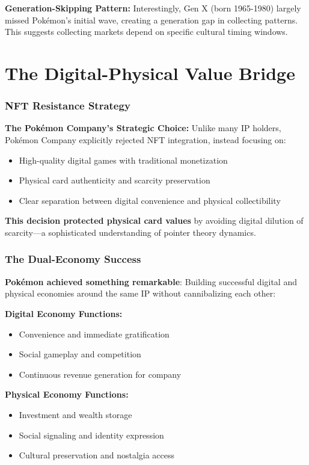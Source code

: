 \documentclass[11pt,oneside]{book}
\begin{document}
\textbf{Generation-Skipping Pattern:}
Interestingly, Gen X (born 1965-1980) largely missed Pokémon's initial wave, creating a generation gap in collecting patterns. This suggests collecting markets depend on specific cultural timing windows.

\section{The Digital-Physical Value Bridge}

\subsubsection{NFT Resistance Strategy}

\textbf{The Pokémon Company's Strategic Choice:}
Unlike many IP holders, Pokémon Company explicitly rejected NFT integration, instead focusing on:
\begin{itemize}
\item High-quality digital games with traditional monetization
\item Physical card authenticity and scarcity preservation
\item Clear separation between digital convenience and physical collectibility
\end{itemize}

\textbf{This decision protected physical card values} by avoiding digital dilution of scarcity—a sophisticated understanding of pointer theory dynamics.

\subsubsection{The Dual-Economy Success}

\textbf{Pokémon achieved something remarkable}: Building successful digital and physical economies around the same IP without cannibalizing each other:

\textbf{Digital Economy Functions:}
\begin{itemize}
\item Convenience and immediate gratification
\item Social gameplay and competition
\item Continuous revenue generation for company
\end{itemize}

\textbf{Physical Economy Functions:}
\begin{itemize}
\item Investment and wealth storage
\item Social signaling and identity expression
\item Cultural preservation and nostalgia access
\end{itemize}
\end{document}

